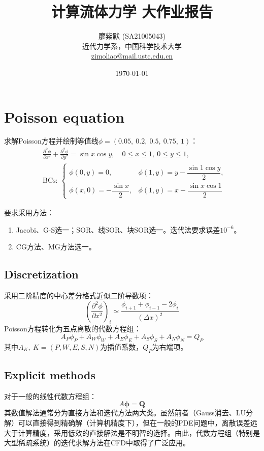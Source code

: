\documentclass[11pt]{article}
\title{\LARGE\textbf{计算流体力学 大作业报告}}
\author{\normalsize 廖紫默 (SA21005043)\\
\small 近代力学系，中国科学技术大学\\
\small \href{mailto:zimoliao@mail.ustc.edu.cn}{zimoliao@mail.ustc.edu.cn}}
\date{\today}
\begin{document}
\maketitle
\thispagestyle{assignment}

\tableofcontents

\newpage
{}
\setcounter{page}{1}
\section{Poisson equation}
求解Poisson方程并绘制等值线$\phi=\left(0.05,\ 0.2,\ 0.5,\ 0.75,\ 1\right)$：
\begin{align}
	 & \frac{\partial^2\phi}{\partial x^2}+\frac{\partial^2\phi}{\partial y^2}=\sin{x}\cos{y},\quad 0\leq x\leq 1,\ 0\leq y\leq 1, \label{eqn:poisson} \\
	 & \text{BCs: }\left\{\begin{array}{ll}
		\phi(0,y)=0,                  & \phi(1,y)=y-\dfrac{\sin{1}\cos{y}}{2}, \\[8pt]
		\phi(x,0)=-\dfrac{\sin x}{2}, & \phi(1,y)=x-\dfrac{\sin{x}\cos{1}}{2}
	\end{array}\right.
\end{align}

要求采用方法：
\begin{enumerate}[label=(\arabic*)]
	\item Jacobi、G-S选一；SOR、线SOR、块SOR选一。迭代法要求误差$10^{-6}$。
	\item CG方法、MG方法选一。
\end{enumerate}

\subsection{Discretization}
采用二阶精度的中心差分格式近似二阶导数项：
\begin{equation}
	\left(\frac{\partial^2\phi}{\partial x^2}\right)_i\simeq\frac{\phi_{i+1}+\phi_{i-1}-2\phi_i}{(\Delta x)^2}
\end{equation}
Poisson方程转化为五点离散的代数方程组：
\begin{equation}
	A_P\phi_P+A_W\phi_W+A_E\phi_E+A_S\phi_S+A_N\phi_N=Q_P
\end{equation}
其中$A_{K},\ K=(P,W,E,S,N)$为插值系数，$Q_P$为右端项。

\subsection{Explicit methods}
对于一般的线性代数方程组：
\begin{equation}
	A\bm{\phi}=\bm{Q} \label{eqn:algebra}
\end{equation}
其数值解法通常分为直接方法和迭代方法两大类。虽然前者（Gauss消去、LU分解）可以直接得到精确解（计算机精度下），但在一般的PDE问题中，离散误差远大于计算精度\citep{ferziger_computational_2020}，采用低效的直接解法是不明智的选择。由此，代数方程组（特别是大型稀疏系统）的迭代求解方法在CFD中取得了广泛应用\citep{saad_iterative_2003}。
\end{document}
